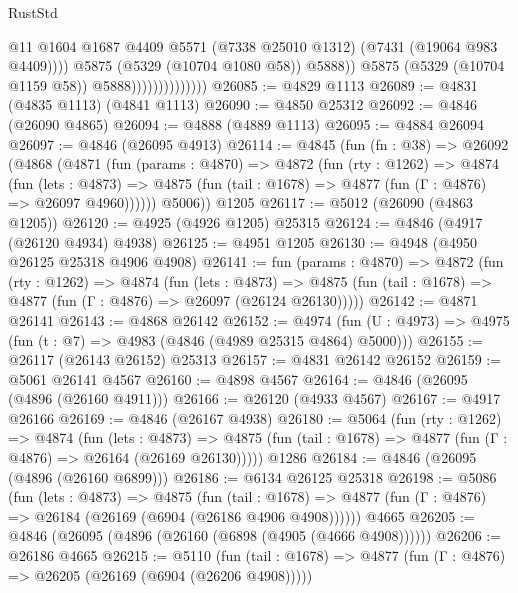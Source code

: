 \begin{lexlean}{RustStd}
\begin{coremodule}
                                        @11
                                        @1604
                                        @1687
                                        @4409
                                        @5571
                                        (@7338 @25010 @1312)
                                        (@7431 (@19064 @983 @4409))))
                                    @5875
                                    (@5329 (@10704 @1080 @58))
                                    @5888))
                                @5875
                                (@5329 (@10704 @1159 @58))
                                @5888))))))))))))))
@26085 := @4829 @1113
@26089 := @4831 (@4835 @1113) (@4841 @1113)
@26090 := @4850 @25312
@26092 := @4846 (@26090 @4865)
@26094 := @4888 (@4889 @1113)
@26095 := @4884 @26094
@26097 := @4846 (@26095 @4913)
@26114 := @4845
    (fun (fn : @38) =>
    @26092
      (@4868
        (@4871
          (fun (params : @4870) =>
          @4872
            (fun (rty : @1262) =>
            @4874
              (fun (lets : @4873) =>
              @4875 (fun (tail : @1678) => @4877 (fun (Γ : @4876) => @26097 @4960))))))
        @5006))
    @1205
@26117 := @5012 (@26090 (@4863 @1205))
@26120 := @4925 (@4926 @1205) @25315
@26124 := @4846 (@4917 (@26120 @4934) @4938)
@26125 := @4951 @1205
@26130 := @4948 (@4950 @26125 @25318 @4906 @4908)
@26141 := fun (params : @4870) =>
  @4872
    (fun (rty : @1262) =>
    @4874
      (fun (lets : @4873) =>
      @4875 (fun (tail : @1678) => @4877 (fun (Γ : @4876) => @26097 (@26124 @26130)))))
@26142 := @4871 @26141
@26143 := @4868 @26142
@26152 := @4974
    (fun (U : @4973) => @4975 (fun (t : @7) => @4983 (@4846 (@4989 @25315 @4864) @5000)))
@26155 := @26117 (@26143 @26152) @25313
@26157 := @4831 @26142 @26152
@26159 := @5061 @26141 @4567
@26160 := @4898 @4567
@26164 := @4846 (@26095 (@4896 (@26160 @4911)))
@26166 := @26120 (@4933 @4567)
@26167 := @4917 @26166
@26169 := @4846 (@26167 @4938)
@26180 := @5064
    (fun (rty : @1262) =>
    @4874
      (fun (lets : @4873) =>
      @4875 (fun (tail : @1678) => @4877 (fun (Γ : @4876) => @26164 (@26169 @26130)))))
    @1286
@26184 := @4846 (@26095 (@4896 (@26160 @6899)))
@26186 := @6134 @26125 @25318
@26198 := @5086
    (fun (lets : @4873) =>
    @4875
      (fun (tail : @1678) =>
      @4877 (fun (Γ : @4876) => @26184 (@26169 (@6904 (@26186 @4906 @4908))))))
    @4665
@26205 := @4846 (@26095 (@4896 (@26160 (@6898 (@4905 (@4666 @4908))))))
@26206 := @26186 @4665
@26215 := @5110
    (fun (tail : @1678) => @4877 (fun (Γ : @4876) => @26205 (@26169 (@6904 (@26206 @4908)))))

\end{coremodule}
\end{lexlean}

